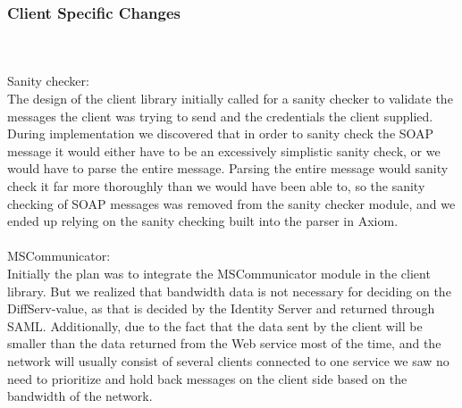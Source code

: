 \subsubsection{Client Specific Changes}\label{Changes:client}
 \\\\
Sanity checker:\\
The design of the client library initially called for a sanity checker to validate the messages the client was trying to send and the credentials the client supplied. During implementation we discovered that in order to sanity check the SOAP message it would either have to be an excessively simplistic sanity check, or we would have to parse the entire message. Parsing the entire message would sanity check it far more thoroughly than we would have been able to, so the sanity checking of SOAP messages was removed from the sanity checker module, and we ended up relying on the sanity checking built into the parser in Axiom.
\\\\
MSCommunicator:\\
Initially the plan was to integrate the MSCommunicator module in the client library. But we realized that bandwidth data is not necessary for deciding on the DiffServ-value, as that is decided by the Identity Server and returned through SAML.
Additionally, due to the fact that the data sent by the client will be smaller than the data returned from the Web service most of the time, and the network will usually consist of several clients connected to one service we saw no need to prioritize and hold back messages on the client side based on the bandwidth of the network.